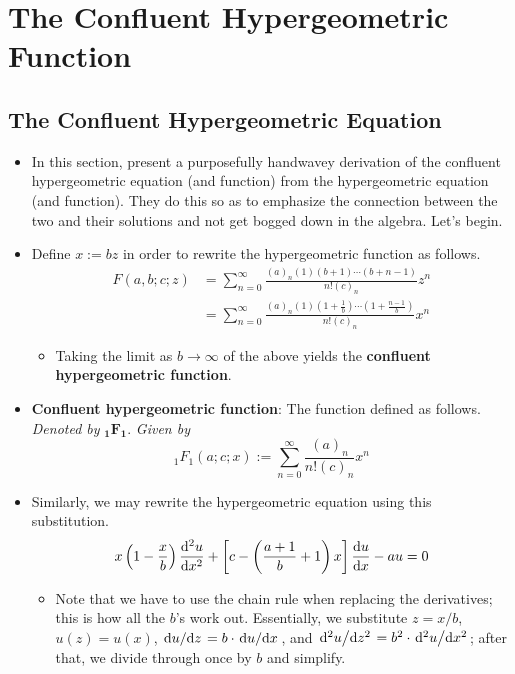 \documentclass[../finalProject.tex]{subfiles}
\begin{document}
\section{The Confluent Hypergeometric Function}
\subsection{The Confluent Hypergeometric Equation}
\begin{itemize}
    \item {}In this section, \textcite{bib:Seaborn} present a purposefully handwavey derivation of the confluent hypergeometric equation (and function) from the hypergeometric equation (and function). They do this so as to emphasize the connection between the two and their solutions and not get bogged down in the algebra. Let's begin.
    \item Define $x:=bz$ in order to rewrite the hypergeometric function as follows.
    \begin{align*}
        F(a,b;c;z) &= \sum_{n=0}^\infty\frac{(a)_n(1)(b+1)\cdots(b+n-1)}{n!(c)_n}z^n\\
        &= \sum_{n=0}^\infty\frac{(a)_n(1)(1+\frac{1}{b})\cdots(1+\frac{n-1}{b})}{n!(c)_n}x^n
    \end{align*}
    \begin{itemize}
        \item Taking the limit as $b\to\infty$ of the above yields the \textbf{confluent hypergeometric function}.
    \end{itemize}
    \item \textbf{Confluent hypergeometric function}: The function defined as follows. \emph{Denoted by} $\bm{{}_1F_1}$. \emph{Given by}
    \begin{equation*}
        {}_1F_1(a;c;x) := \sum_{n=0}^\infty\frac{(a)_n}{n!(c)_n}x^n
    \end{equation*}
    \item Similarly, we may rewrite the hypergeometric equation using this substitution.
    \begin{equation*}
        x\left( 1-\frac{x}{b} \right)\dv[2]{u}{x}+\left[ c-\left( \frac{a+1}{b}+1 \right)x \right]\dv{u}{x}-au = 0
    \end{equation*}
    \begin{itemize}
        \item Note that we have to use the chain rule when replacing the derivatives; this is how all the $b$'s work out. Essentially, we substitute $z=x/b$, $u(z)=u(x)$, $\dv*{u}{z}=b\cdot\dv*{u}{x}$, and $\dv*[2]{u}{z}=b^2\cdot\dv*[2]{u}{x}$; after that, we divide through once by $b$ and simplify.

\end{itemize}
\end{itemize}
\end{document}
